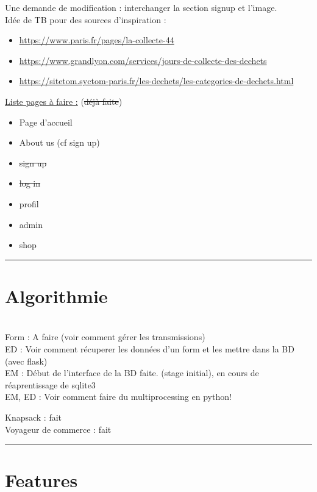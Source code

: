 \documentclass[10pt,a4paper]{report}
\begin{document}
Une demande de modification : interchanger la section signup et l'image. \\

Idée de TB pour des sources d'inspiration : 
\begin{itemize}
        \item \url{https://www.paris.fr/pages/la-collecte-44}
        \item \url{https://www.grandlyon.com/services/jours-de-collecte-des-dechets }
        \item \url{https://sitetom.syctom-paris.fr/les-dechets/les-categories-de-dechets.html}
\end{itemize}

\uline{Liste pages à faire :} (\sout{déjà faite})
\begin{itemize}
        \item Page d'accueil
        \item About us (cf sign up)
        \item \sout{sign up}
        \item \sout{log in}
        \item profil
        \item admin
        \item shop
\end{itemize}

\rule{\linewidth}{0.5mm} \bigskip
\section{Algorithmie}
\ \\

Form : A faire (voir comment gérer les transmissions) \\

ED : Voir comment récuperer les données d'un form et les mettre dans la BD (avec flask) \\

EM : Début de l'interface de la BD faite. (stage initial), en cours de réaprentissage de sqlite3 \\

EM, ED : Voir comment faire du multiprocessing en python!

Knapsack : fait\ \\

Voyageur de commerce : fait


\rule{\linewidth}{0.5mm} \bigskip
\section{Features}
\end{document}
